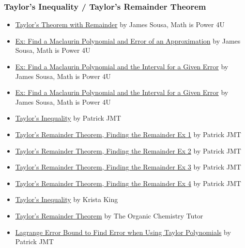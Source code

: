 \subsubsection{Taylor's Inequality / Taylor's Remainder Theorem}
\label{sss:tayl-341c}


\begin{itemize}
    \item \href{https://www.youtube.com/watch?v=DP_pGQaNGdw}{Taylor's Theorem with Remainder} by James Sousa, Math is Power 4U
    \item \href{https://www.youtube.com/watch?v=wqgAG9TtNAA}{Ex: Find a Maclaurin Polynomial and Error of an Approximation} by James Sousa, Math is Power 4U
    \item \href{https://www.youtube.com/watch?v=CExJJShnzzg}{Ex: Find a Maclaurin Polynomial and the Interval for a Given Error} by James Sousa, Math is Power 4U
    \item \href{https://www.youtube.com/watch?v=lwEU4ZkwcJA}{Ex: Find a Maclaurin Polynomial and the Interval for a Given Error} by James Sousa, Math is Power 4U
    \item \href{https://www.youtube.com/watch?v=9LnCcAoEHG4}{Taylor's Inequality} by Patrick JMT
    \item \href{https://www.youtube.com/watch?v=yJWFAG1g4Jw}{Taylor's Remainder Theorem, Finding the Remainder Ex 1} by Patrick JMT
    \item \href{https://www.youtube.com/watch?v=30n1eiu8lFs}{Taylor's Remainder Theorem, Finding the Remainder Ex 2} by Patrick JMT
    \item \href{https://www.youtube.com/watch?v=pZBRc5uegEs}{Taylor's Remainder Theorem, Finding the Remainder Ex 3} by Patrick JMT
    \item \href{https://www.youtube.com/watch?v=aa0hyXZH9vw}{Taylor's Remainder Theorem, Finding the Remainder Ex 4} by Patrick JMT
    \item \href{https://www.youtube.com/watch?v=xsCTDZQULJ4}{Taylor's Inequality} by Krista King
    \item \href{https://www.youtube.com/watch?v=lY0LzJXTgeo}{Taylor's Remainder Theorem} by The Organic Chemistry Tutor
    \item \href{https://www.youtube.com/watch?v=Q9y43_02vFw}{Lagrange Error Bound to Find Error when Using Taylor Polynomials} by Patrick JMT
\end{itemize}


